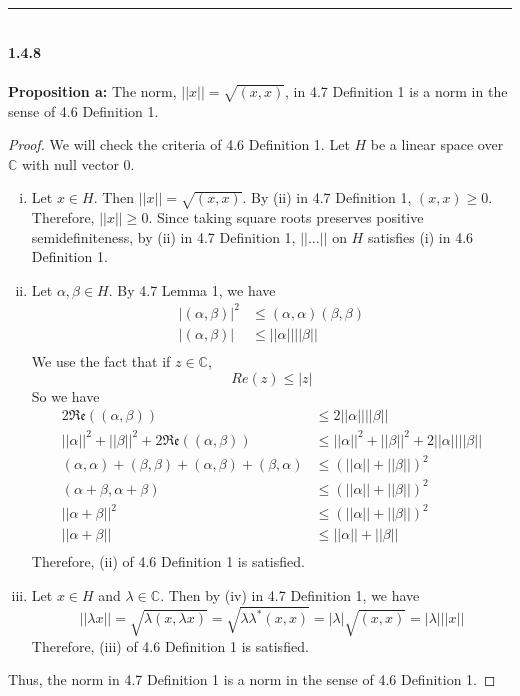 \documentclass[]{book}
\begin{document}
\noindent\rule{15cm}{0.4pt} \\

{\bf 1.4.8} \\ \\
{\bf Proposition a:} The norm, $||x||=\sqrt{(x,x)}$, in 4.7 Definition 1 is a norm in the sense of 4.6 Definition 1.
\begin{proof}
We will check the criteria of 4.6 Definition 1. Let $H$ be a linear space over $\mathbb{C}$ with null vector $0$.
\begin{enumerate}[(i)]
\item Let $x\in H$. Then $||x||=\sqrt{(x,x)}$. By (ii) in 4.7 Definition 1, $(x,x)\geqslant 0$. Therefore, $||x||\geqslant 0$.
Since taking square roots preserves positive semidefiniteness, by (ii) in 4.7 Definition 1, $||\dots||$ on $H$ satisfies (i) in 4.6 Definition 1.
\item Let $\alpha,\beta\in H$. By 4.7 Lemma 1, we have 
\begin{align*}
|(\alpha,\beta)|^2 &\leqslant (\alpha,\alpha)(\beta,\beta) \\ 
|(\alpha,\beta)| &\leqslant ||\alpha||||\beta|| \\
\end{align*}
We use the fact that if $z\in\mathbb{C}$, 
$$Re(z) \leqslant |z|$$ 
So we have
\begin{align*}
2\mathfrak{Re}((\alpha,\beta)) &\leqslant 2||\alpha||||\beta|| \\
||\alpha||^2 + ||\beta||^2 + 2\mathfrak{Re}((\alpha,\beta)) &\leqslant ||\alpha||^2 + ||\beta||^2 + 2||\alpha||||\beta|| \\
(\alpha,\alpha) + (\beta,\beta) + (\alpha,\beta) + (\beta,\alpha) &\leqslant (||\alpha|| + ||\beta||)^2 \\
(\alpha+\beta,\alpha+\beta) &\leqslant (||\alpha|| + ||\beta||)^2 \\
||\alpha+\beta||^2 &\leqslant (||\alpha|| + ||\beta||)^2 \\
||\alpha+\beta|| &\leqslant ||\alpha|| + ||\beta|| \\
\end{align*}
Therefore, (ii) of 4.6 Definition 1 is satisfied.
\item Let $x\in H$ and $\lambda\in\mathbb{C}$. Then by (iv) in 4.7 Definition 1, we have
$$||\lambda x|| = \sqrt{\lambda(x,\lambda x)} = \sqrt{\lambda\lambda^*(x,x)}= |\lambda|\sqrt{(x,x)}=|\lambda| ||x||$$
Therefore, (iii) of 4.6 Definition 1 is satisfied.
\end{enumerate}
Thus, the norm in 4.7 Definition 1 is a norm in the sense of 4.6 Definition 1.
\end{proof}
\end{document}
